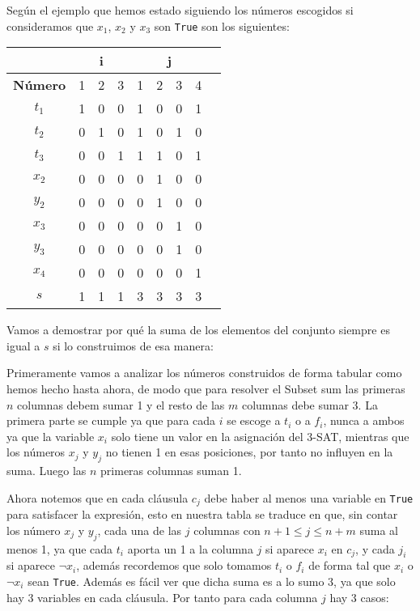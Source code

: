 \documentclass[11pt]{article}
\begin{document}
    Según el ejemplo que hemos estado siguiendo los números escogidos si consideramos que $x_1$, $x_2$ y $x_3$
    son \texttt{True} son los siguientes:

    \begin{table}[!h]
        \centering
        \begin{tabular}{|c|c|c|c|c|c|c|c|c|}
        \hline
        \multicolumn{1}{|c|}{} & \multicolumn{3}{c|}{\textbf{i}} & \multicolumn{4}{c|}{\textbf{j}} \\ \hline
        \textbf{Número} & 1 & 2 & 3 & 1 & 2 & 3 & 4 \\ \hline
        $t_1$ & 1 & 0 & 0 & 1 & 0 & 0 & 1 \\ \hline
        $t_2$ & 0 & 1 & 0 & 1 & 0 & 1 & 0 \\ \hline
        $t_3$ & 0 & 0 & 1 & 1 & 1 & 0 & 1 \\ \hline
        $x_2$ & 0 & 0 & 0 & 0 & 1 & 0 & 0 \\ \hline
        $y_2$ & 0 & 0 & 0 & 0 & 1 & 0 & 0 \\ \hline
        $x_3$ & 0 & 0 & 0 & 0 & 0 & 1 & 0 \\ \hline
        $y_3$ & 0 & 0 & 0 & 0 & 0 & 1 & 0 \\ \hline
        $x_4$ & 0 & 0 & 0 & 0 & 0 & 0 & 1 \\ \hline
        $s$   & 1 & 1 & 1 & 3 & 3 & 3 & 3 \\ \hline
        \end{tabular}
    \end{table}

    Vamos a demostrar por qué la suma de los elementos del conjunto siempre es igual a $s$ si lo construimos
    de esa manera:

    Primeramente vamos a analizar los números construidos de forma tabular como hemos hecho hasta ahora, de modo
    que para resolver el Subset sum las primeras $n$ columnas debem sumar 1 y el resto de las $m$ columnas debe sumar
    3. La primera parte se cumple ya que para cada $i$ se escoge a $t_i$ o a $f_i$, nunca a ambos ya que la variable
    $x_i$ solo tiene un valor en la asignación del 3-SAT, mientras que los números $x_j$ y $y_j$ no tienen 1 en esas
    posiciones, por tanto no influyen en la suma. Luego las $n$ primeras columnas suman 1. 
    
    Ahora notemos que en cada cláusula $c_j$ debe haber al menos una variable en \texttt{True} para satisfacer la expresión, 
    esto en nuestra tabla se traduce en que, sin contar los número $x_j$ y $y_j$, cada una de las $j$ columnas con $n+1 \leq j \leq n+m$
    suma al menos 1, ya que cada $t_i$ aporta un 1 a la columna $j$ si aparece $x_i$ en $c_j$, y cada $j_i$ si aparece $\neg x_i$,
    además recordemos que solo tomamos $t_i$ o $f_i$ de forma tal que $x_i$ o $\neg x_i$ sean \texttt{True}. Además es fácil ver 
    que dicha suma es a lo sumo 3, ya que solo hay 3 variables en cada cláusula. Por tanto para cada columna $j$ hay 3 casos:
\end{document}
